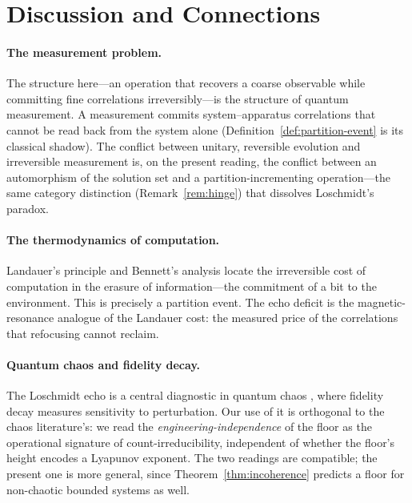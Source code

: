 \documentclass[11pt,a4paper]{article}
\theoremstyle{thmstyle}
\theoremstyle{definition}
\theoremstyle{remark}
\begin{document}
\section{Discussion and Connections}
\label{sec:discussion}

\paragraph{The measurement problem.} The structure here---an operation
that recovers a coarse observable while committing fine correlations
irreversibly---is the structure of quantum measurement. A measurement
commits system--apparatus correlations that cannot be read back from the
system alone (Definition~\ref{def:partition-event} is its classical
shadow). The conflict between unitary, reversible evolution and
irreversible measurement is, on the present reading, the conflict between
an automorphism of the solution set and a partition-incrementing
operation---the same category distinction
(Remark~\ref{rem:hinge}) that dissolves Loschmidt's paradox.

\paragraph{The thermodynamics of computation.} Landauer's principle
\citep{landauer1961} and Bennett's analysis \citep{bennett1982} locate
the irreversible cost of computation in the erasure of information---the
commitment of a bit to the environment. This is precisely a partition
event. The echo deficit is the magnetic-resonance analogue of the
Landauer cost: the measured price of the correlations that refocusing
cannot reclaim.

\paragraph{Quantum chaos and fidelity decay.} The Loschmidt echo is a
central diagnostic in quantum chaos \citep{peres1984,gorin2006}, where
fidelity decay measures sensitivity to perturbation. Our use of it is
orthogonal to the chaos literature's: we read the
\emph{engineering-independence} of the floor as the operational signature
of count-irreducibility, independent of whether the floor's height
encodes a Lyapunov exponent. The two readings are compatible; the present
one is more general, since Theorem~\ref{thm:incoherence} predicts a floor
for non-chaotic bounded systems as well.
\end{document}
